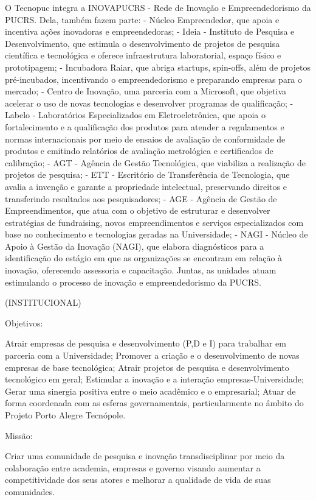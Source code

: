 O Tecnopuc integra a INOVAPUCRS - Rede de Inovação e Empreendedorismo da PUCRS. Dela, também fazem parte:
- Núcleo Empreendedor, que apoia e incentiva ações inovadoras e empreendedoras;
- Ideia - Instituto de Pesquisa e Desenvolvimento, que estimula o desenvolvimento de projetos de pesquisa científica e tecnológica e oferece infraestrutura laboratorial, espaço físico e prototipagem;
- Incubadora Raiar, que abriga startups, spin-offs, além de projetos pré-incubados, incentivando o empreendedorismo e preparando empresas para o mercado;
- Centro de Inovação, uma parceria com a Microsoft, que objetiva acelerar o uso de novas tecnologias e desenvolver programas de qualificação;
- Labelo - Laboratórios Especializados em Eletroeletrônica, que apoia o fortalecimento e a qualificação dos produtos para atender a regulamentos e normas internacionais por meio de ensaios de avaliação de conformidade de produtos e emitindo relatórios de avaliação metrológica e certificados de calibração;
- AGT - Agência de Gestão Tecnológica, que viabiliza a realização de projetos de pesquisa;
- ETT - Escritório de Transferência de Tecnologia, que avalia a invenção e garante a propriedade intelectual, preservando direitos e transferindo resultados aos pesquisadores;
- AGE - Agência de Gestão de Empreendimentos, que atua com o objetivo de estruturar e desenvolver estratégias de fundraising, novos empreendimentos e serviços especializados com base no conhecimento e tecnologias geradas na Universidade;
- NAGI - Núcleo de Apoio à Gestão da Inovação (NAGI), que elabora diagnósticos para a identificação do estágio em que as organizações se encontram em relação à inovação, oferecendo assessoria e capacitação.
Juntas, as unidades atuam estimulando o processo de inovação e empreendedorismo da PUCRS.

(INSTITUCIONAL)

Objetivos: 

Atrair empresas de pesquisa e desenvolvimento (P,D e I) para trabalhar em parceria com a Universidade;
Promover a criação e o desenvolvimento de novas empresas de base tecnológica;
Atrair projetos de pesquisa e desenvolvimento tecnológico em geral;
Estimular a inovação e a interação empresas-Universidade;
Gerar uma sinergia positiva entre o meio acadêmico e o empresarial;
Atuar de forma coordenada com as esferas governamentais, particularmente no âmbito do Projeto Porto Alegre Tecnópole.

Missão:

Criar uma comunidade de pesquisa e inovação transdisciplinar por meio da colaboração entre academia, empresas e governo visando aumentar a competitividade dos seus atores e melhorar a qualidade de vida de suas comunidades.

